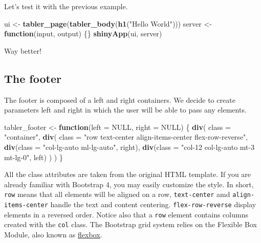 \documentclass[
]{book}
\newenvironment{Shaded}{\begin{snugshade}}{\end{snugshade}}
\newcommand{\ControlFlowTok}[1]{\textcolor[rgb]{0.13,0.29,0.53}{\textbf{#1}}}
\newcommand{\DataTypeTok}[1]{\textcolor[rgb]{0.13,0.29,0.53}{#1}}
\newcommand{\KeywordTok}[1]{\textcolor[rgb]{0.13,0.29,0.53}{\textbf{#1}}}
\newcommand{\NormalTok}[1]{#1}
\newcommand{\OtherTok}[1]{\textcolor[rgb]{0.56,0.35,0.01}{#1}}
\newcommand{\StringTok}[1]{\textcolor[rgb]{0.31,0.60,0.02}{#1}}
\begin{document}
Let's test it with the previous example.

\begin{Shaded}
\begin{Highlighting}[]
\NormalTok{ui <-}\StringTok{ }\KeywordTok{tabler_page}\NormalTok{(}\KeywordTok{tabler_body}\NormalTok{(}\KeywordTok{h1}\NormalTok{(}\StringTok{"Hello World"}\NormalTok{)))}
\NormalTok{server <-}\StringTok{ }\ControlFlowTok{function}\NormalTok{(input, output) \{\}}
\KeywordTok{shinyApp}\NormalTok{(ui, server)}
\end{Highlighting}
\end{Shaded}

Way better!

\hypertarget{the-footer}{%
\subsection{The footer}\label{the-footer}}

The footer is composed of a left and right containers. We decide to create parameters left and right in which the user will be able to pass any elements.

\begin{Shaded}
\begin{Highlighting}[]
\NormalTok{tabler_footer <-}\StringTok{ }\ControlFlowTok{function}\NormalTok{(}\DataTypeTok{left =} \OtherTok{NULL}\NormalTok{, }\DataTypeTok{right =} \OtherTok{NULL}\NormalTok{) \{}
  \KeywordTok{div}\NormalTok{(}
    \DataTypeTok{class =} \StringTok{"container"}\NormalTok{,}
    \KeywordTok{div}\NormalTok{(}
      \DataTypeTok{class =} \StringTok{"row text-center align-items-center flex-row-reverse"}\NormalTok{,}
      \KeywordTok{div}\NormalTok{(}\DataTypeTok{class =} \StringTok{"col-lg-auto ml-lg-auto"}\NormalTok{, right),}
      \KeywordTok{div}\NormalTok{(}\DataTypeTok{class =} \StringTok{"col-12 col-lg-auto mt-3 mt-lg-0"}\NormalTok{, left)}
\NormalTok{    )}
\NormalTok{  )}
\NormalTok{\}}
\end{Highlighting}
\end{Shaded}

All the class attributes are taken from the original HTML template. If you are already familiar with Bootstrap 4, you may easily customize the style. In short, \texttt{row} means that all elements will be aligned on a row, \texttt{text-center} amd \texttt{align-items-center} handle the text and content centering. \texttt{flex-row-reverse} display elements in a reversed order. Notice also that a \texttt{row} element contains columns created with the \texttt{col} class. The Bootstrap grid system relies on the Flexible Box Module, also known as \href{https://developer.mozilla.org/en-US/docs/Web/CSS/CSS_Flexible_Box_Layout/Basic_Concepts_of_Flexbox}{flexbox}.
\end{document}
